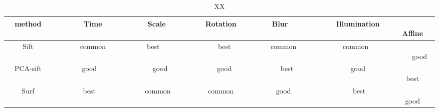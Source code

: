 ﻿\begin{table}
  \centering
  \begin{tabular}{|c|c|c|c|c|c|c|}
     \hline
     method　&　　　Time　　　&　　　Scale　　　　&　　Rotation　　　&　Blur 　　　&　　　Illumination　　　&　　　Affine\\
     \hline
    Sift　　　&　　　common　　&　　best 　　　&　　　best 　　　　&　　common　　&　　 common　　　&　 　　good\\
    \hline
    PCA-sift　　&　　good　　&　　　　good　　　&　　　good　　　&　　　best　　　&　　　good　　　　&　　　　best\\
    \hline
    Surf　　　　&　　best　　　&　 　　common　　&　　common 　　&　　good　　　&　　　 best　　　　 &　　　　good\\
     \hline
   \end{tabular}
  \caption{XX}
\end{table}

